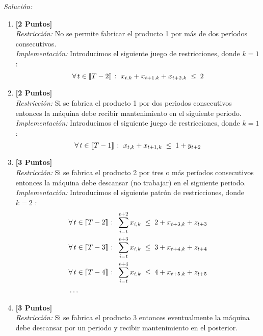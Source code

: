 \documentclass[ a4paper, twoside, 11pt]{article}
\begin{document}
\begin{problem}
\emph{Soluci\'on:}
\begin{enumerate}[label=\textbf{\alph*)}]
\item \textbf{[2 Puntos]} \\[1ex]
\emph{Restricci\'on:} No se permite fabricar el producto 1 por m\'as de dos per\'iodos consecutivos. \\[1ex]
\emph{Implementaci\'on:} Introducimos el siguiente juego de restricciones, donde $k = 1$ : 
\[
\forall \, t \in \llbracket T-2 \rrbracket \; \colon \;
x_{t,k} + x_{t+1,k} + x_{t+2,k} \; \leq \; 2
\]
\item \textbf{[2 Puntos]} \\[1ex]
\emph{Restricci\'on:} Si se fabrica el producto 1 por dos periodos consecutivos entonces la m\'aquina debe recibir mantenimiento en el siguiente periodo. \\[1ex]
\emph{Implementaci\'on:} Introducimos el siguiente juego de restricciones, donde $k = 1$ : 
\[
\forall \, t \in \llbracket T-1 \rrbracket \; \colon \;
x_{t,k} + x_{t+1,k} \; \leq \; 1 + y_{t+2}
\]
\item \textbf{[3 Puntos]} \\[1ex]
\emph{Restricci\'on:} Si se fabrica el producto 2 por tres o m\'as per\'iodos consecutivos entonces la m\'aquina debe descansar (\ie no trabajar) en el siguiente periodo. \\[1ex]
\emph{Implementaci\'on:} Introducimos el siguiente patr\'on de restricciones, donde $k = 2$ : 
\begin{align*}
& \forall \, t \in \llbracket T-2 \rrbracket \; \colon \;
\sum_{i = t}^{t+2} x_{i,k} \; \leq \; 2 + x_{t+3,k} + z_{t+3} \\
& \forall \, t \in \llbracket T-3 \rrbracket \; \colon \;
\sum_{i = t}^{t+3} x_{i,k} \; \leq \; 3 + x_{t+4,k} + z_{t+4} \\
& \forall \, t \in \llbracket T-4 \rrbracket \; \colon \;
\sum_{i = t}^{t+4} x_{i,k} \; \leq \; 4 + x_{t+5,k} + z_{t+5} \\
& \dots
\end{align*}
\item \textbf{[3 Puntos]} \\[1ex]
\emph{Restricci\'on:} Si se fabrica el producto 3 entonces eventualmente la m\'aquina debe descansar por un periodo y recibir mantenimiento en el posterior. \\[1ex]

\end{enumerate}
\end{problem}
\end{document}
